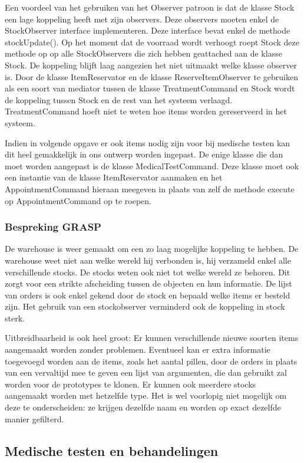 \documentclass[a4paper]{article}
\begin{document}
Een voordeel van het gebruiken van het Observer patroon is dat de klasse Stock een lage koppeling heeft met zijn observers. Deze observers moeten enkel de StockObserver interface implementeren. Deze interface bevat enkel de methode stockUpdate(). Op het moment dat de voorraad wordt verhoogt roept Stock deze methode op op alle StockObservers die zich hebben geattached aan de klasse Stock.  De koppeling blijft laag aangezien het niet uitmaakt welke klasse observer is.
Door de klasse ItemReservator en de klasse ReserveItemObserver te gebruiken als een soort van mediator tussen de klasse TreatmentCommand en Stock wordt de koppeling tussen Stock en de rest van het systeem verlaagd. TreatmentCommand hoeft niet te weten hoe items worden gereserveerd in het systeem.

Indien in volgende opgave er ook items nodig zijn voor bij medische testen kan dit heel gemakkelijk in ons ontwerp worden ingepast. De enige klasse die dan moet worden aangepast is de klasse MedicalTestCommand. Deze klasse moet ook een instantie van de klasse ItemReservator aanmaken en het AppointmentCommand hieraan meegeven in plaats van zelf de methode execute op AppointmentCommand op te roepen.

\subsubsection{Bespreking GRASP}
De warehouse is weer gemaakt om een zo laag mogelijke koppeling te hebben. De warehouse weet niet aan welke wereld hij verbonden is, hij verzameld enkel alle verschillende stocks. De stocks weten ook niet tot welke wereld ze behoren. Dit zorgt voor een strikte afscheiding tussen de objecten en hun informatie. De lijst van orders is ook enkel gekend door de stock en bepaald welke items er besteld zijn. Het gebruik van een stockobserver verminderd ook de koppeling in stock sterk.

Uitbreidbaarheid is ook heel groot: Er kunnen verschillende nieuwe soorten items aangemaakt worden zonder problemen. Eventueel kan er extra informatie toegevoegd worden aan de items, zoals het aantal pillen, door de orders in plaats van een vervaltijd mee te geven een lijst van argumenten, die dan gebruikt zal worden voor de prototypes te klonen. Er kunnen ook meerdere stocks aangemaakt worden met hetzelfde type. Het is wel voorlopig niet mogelijk om deze te onderscheiden: ze krijgen dezelfde naam en worden op exact dezelfde manier gefilterd.

\subsection{Medische testen en behandelingen \label{sec:medicaltest} \label{sec:treatment}}
\end{document}
